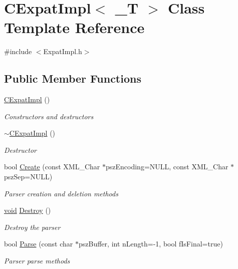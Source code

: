 \hypertarget{class_c_expat_impl}{\section{\-C\-Expat\-Impl$<$ \-\_\-\-T $>$ \-Class \-Template \-Reference}
\label{class_c_expat_impl}
}


{\ttfamily \#include $<$\-Expat\-Impl.\-h$>$}

\subsection*{\-Public \-Member \-Functions}
\begin{DoxyCompactItemize}
\item 
\hyperlink{class_c_expat_impl_a59f688f607c739742ef3ac272ea02fee}{\-C\-Expat\-Impl} ()
\begin{DoxyCompactList}\small\item\em \-Constructors and destructors \end{DoxyCompactList}\item 
\hyperlink{class_c_expat_impl_a6905e278a30c7f7331001ab89f249c63}{$\sim$\-C\-Expat\-Impl} ()
\begin{DoxyCompactList}\small\item\em \-Destructor \end{DoxyCompactList}\item 
bool \hyperlink{class_c_expat_impl_ada29fce37e448ceb6ea09a98de028149}{\-Create} (const \-X\-M\-L\-\_\-\-Char $\ast$psz\-Encoding=\-N\-U\-L\-L, const \-X\-M\-L\-\_\-\-Char $\ast$psz\-Sep=\-N\-U\-L\-L)
\begin{DoxyCompactList}\small\item\em \-Parser creation and deletion methods \end{DoxyCompactList}\item 
\hyperlink{_cpclient_8h_a6464f7480a0fd0ee170cba12b2c0497f}{void} \hyperlink{class_c_expat_impl_a2e4dcba61823bcc922b1348fcbe787db}{\-Destroy} ()
\begin{DoxyCompactList}\small\item\em \-Destroy the parser \end{DoxyCompactList}\item 
bool \hyperlink{class_c_expat_impl_a76062f116c2a9c99d42631da6e806339}{\-Parse} (const char $\ast$psz\-Buffer, int n\-Length=-\/1, bool f\-Is\-Final=true)
\begin{DoxyCompactList}\small\item\em \-Parser parse methods \end{DoxyCompactList}\item 

\end{DoxyCompactItemize}
